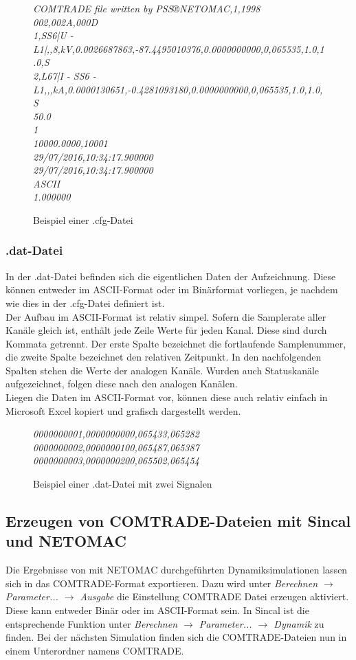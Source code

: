 \documentclass{scrartcl}
\begin{document}
\begin{onehalfspace}
\begin{figure}[H]
\textit{COMTRADE file written by PSS®NETOMAC,1,1998 \\
002,002A,000D \\
1,SS6|U - L1|,,8,kV,0.0026687863,-87.4495010376,0.0000000000,0,065535,1.0,1.0,S \\
2,L67|I - SS6 - L1,,,kA,0.0000130651,-0.4281093180,0.0000000000,0,065535,1.0,1.0,S \\
50.0 \\
1 \\
10000.0000,10001 \\
29/07/2016,10:34:17.900000 \\
29/07/2016,10:34:17.900000 \\
ASCII \\
1.000000}
\caption{Beispiel einer .cfg-Datei}
\label{bsp-cfg}
\end{figure}

\subsubsection{.dat-Datei}
In der .dat-Datei befinden sich die eigentlichen Daten der Aufzeichnung. Diese können entweder im ASCII-Format oder im Binärformat vorliegen, je nachdem wie dies in der .cfg-Datei definiert ist. \\
Der Aufbau im ASCII-Format ist relativ simpel. Sofern die Samplerate aller Kanäle gleich ist, enthält jede Zeile Werte für jeden Kanal. Diese sind durch Kommata getrennt. Der erste Spalte bezeichnet die fortlaufende Samplenummer, die zweite Spalte bezeichnet den relativen Zeitpunkt. In den nachfolgenden Spalten stehen die Werte der analogen Kanäle. Wurden auch Statuskanäle aufgezeichnet, folgen diese nach den analogen Kanälen. \\
Liegen die Daten im ASCII-Format vor, können diese auch relativ einfach in Microsoft Excel kopiert und grafisch dargestellt werden.

\begin{figure}[H]
\textit{0000000001,0000000000,065433,065282 \\
0000000002,0000000100,065487,065387 \\
0000000003,0000000200,065502,065454}
\caption{Beispiel einer .dat-Datei mit zwei Signalen}
\end{figure}

\subsection{Erzeugen von COMTRADE-Dateien mit Sincal und NETOMAC}
Die Ergebnisse von mit NETOMAC durchgeführten Dynamiksimulationen lassen sich in das COMTRADE-Format exportieren. Dazu wird unter \textit{Berechnen $\rightarrow$ Parameter... $\rightarrow$ Ausgabe} die Einstellung \glqq COMTRADE Datei erzeugen\grqq{} aktiviert. Diese kann entweder Binär oder im ASCII-Format sein. In Sincal ist die entsprechende Funktion unter \textit{Berechnen $\rightarrow$ Parameter... $\rightarrow$ Dynamik} zu finden. Bei der nächsten Simulation finden sich die COMTRADE-Dateien nun in einem Unterordner namens COMTRADE.


\end{onehalfspace}
\end{document}
